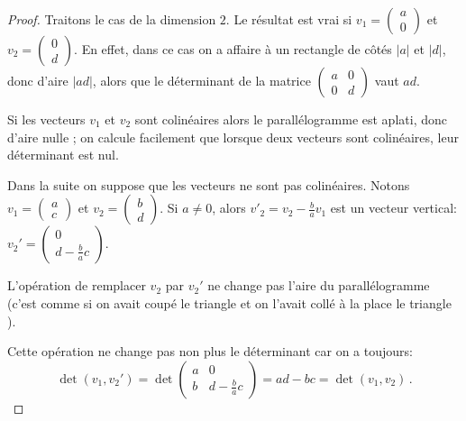\documentclass[class=report,crop=false]{standalone}
\begin{document}
\begin{proof}
Traitons le cas de la dimension $2$. Le résultat est vrai si
$v_1=\left(\begin{smallmatrix}a\\0\end{smallmatrix}\right)$ et
$v_2=\left(\begin{smallmatrix}0\\d\end{smallmatrix}\right)$.
En effet, dans ce cas on a affaire à un rectangle de côtés $|a|$ et $|d|$, donc d'aire
$|ad|$, alors que le déterminant de la matrice
$\begin{pmatrix}
	a&0\\0&d
\end{pmatrix}$
vaut $ad$.


\bigskip
Si les vecteurs $v_1$ et $v_2$ sont colinéaires alors
le parallélogramme est aplati, donc d'aire nulle ; on calcule facilement
que lorsque deux vecteurs sont colinéaires, leur déterminant est nul.

\medskip
Dans la suite on suppose que les vecteurs ne sont pas colinéaires.
Notons $v_1= \left(\begin{smallmatrix}a\\c\end{smallmatrix}\right)$ et
$v_2= \left(\begin{smallmatrix}b\\d\end{smallmatrix}\right)$.
Si $a\neq0$, alors $v'_2=v_2-\frac{b}{a}v_1$ est un vecteur vertical:
$v_2'=\left(\begin{smallmatrix}0\\d-\frac{b}{a}c\end{smallmatrix}\right)$.


L'opération  de remplacer $v_2$ par $v_2'$ ne change
pas l'aire du parallélogramme (c'est comme si on avait coupé le triangle 
et on l'avait collé à la place le triangle ).



Cette opération ne change pas non plus le déterminant car on a toujours:
$$\det (v_1,v_2')=
\det \begin{pmatrix}
a & 0 \\ b & d-\frac{b}{a}c
\end{pmatrix}
=ad-bc=\det(v_1,v_2)\, .$$


\end{proof}
\end{document}
